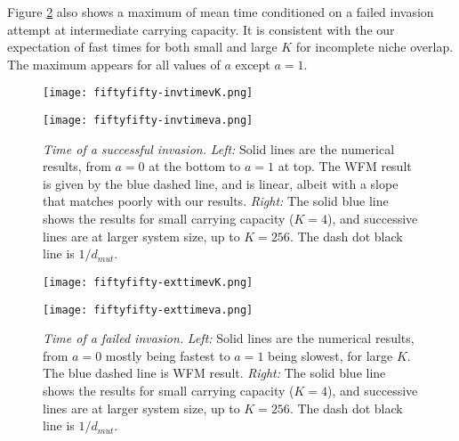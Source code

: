 Figure \ref{Tfail} also shows a maximum of mean time conditioned on a failed invasion attempt at intermediate carrying capacity. 
It is consistent with the our expectation of fast times for both small and large $K$ for incomplete niche overlap. 
The maximum appears for all values of $a$ except $a=1$. 

\begin{figure}[ht!]
	\centering
	\begin{minipage}{0.49\linewidth}
		\centering
		\texttt{[image: fiftyfifty-invtimevK.png]}
	\end{minipage}
	\begin{minipage}{0.49\linewidth}
		\centering
		\texttt{[image: fiftyfifty-invtimeva.png]}
	\end{minipage}
	\caption{\emph{Time of a successful invasion.} 
		\emph{Left:} Solid lines are the numerical results, from $a=0$ at the bottom to $a=1$ at top. The WFM result is given by the blue dashed line, and is linear, albeit with a slope that matches poorly with our results. 
		\emph{Right:} The solid blue line shows the results for small carrying capacity ($K=4$), and successive lines are at larger system size, up to $K=256$. The dash dot black line is $1/d_{mut}$. 
	} \label{Tsucc}
\end{figure}%

\begin{figure}[h]
	\centering
	\begin{minipage}{0.49\linewidth}
		\centering
		\texttt{[image: fiftyfifty-exttimevK.png]}
	\end{minipage}
	\begin{minipage}{0.49\linewidth}
		\centering
		\texttt{[image: fiftyfifty-exttimeva.png]}
	\end{minipage}
	\caption{\emph{Time of a failed invasion.}
		\emph{Left:} Solid lines are the numerical results, from $a=0$ mostly being fastest to $a=1$ being slowest, for large $K$. The blue dashed line is WFM result. 
		\emph{Right:} The solid blue line shows the results for small carrying capacity ($K=4$), and successive lines are at larger system size, up to $K=256$. The dash dot black line is $1/d_{mut}$. 
	} \label{Tfail}
\end{figure}

